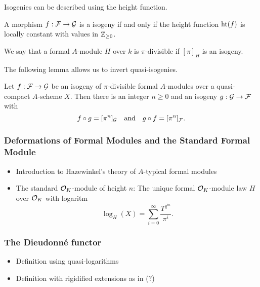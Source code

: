 Isogenies can be described using the height function.

\begin{lem}
  A morphism $f: \mathcal{F} \to \mathcal{G}$ is a isogeny if and only if the height 
  function $\textnormal{ht}(f)$ is locally constant with values in $\mathbb{Z}_{\geq 0}$. 
\end{lem}

\begin{defi}
  We say that a formal $A$-module $H$ over $k$ is $\pi$-divisible if 
  $[\pi]_H$ is an isogeny. 
\end{defi}

The following lemma allows us to invert quasi-isogenies.

\begin{lem}
  Let $f: \mathcal{F} \to \mathcal{G}$ be an isogeny of $\pi$-divisible formal $A$-modules over a
  quasi-compact  $A$-scheme $X$. Then there is an 
  integer $n \geq 0$ and an isogeny $g: \mathcal{G} \to \mathcal{F}$ with 
  \begin{equation*}
    f \circ g = [\pi^n]_{\mathcal{G}} \quad \text{and} \quad g \circ f = [\pi^n]_{\mathcal{F}}.
  \end{equation*}
\end{lem}

\subsubsection{Deformations of Formal Modules and the Standard Formal Module} %
\label{ssub:Deformations of Formal Modules and the Standard Formal Module}
\begin{itemize}
  \item Introduction to Hazewinkel's theory of $A$-typical formal modules
  \item The standard $\mathcal{O}_K$-module of height $n$: The unique formal $\mathcal{O}_K$-module law $H$ over
    $\mathcal{O}_K$ with logaritm 
    \begin{equation*}
      \log_H(X) = \sum_{i = 0}^\infty \frac{T^{q^{in}}}{\pi^i}.
    \end{equation*}
\end{itemize}


\subsubsection{The Dieudonn\'e functor} %
\label{ssub:The Dieudonne functor}
\begin{itemize}
  \item Definition using quasi-logarithms
  \item Definition with rigidified extensions as in \cite{hopkins1994equivariant} (?)
\end{itemize}

